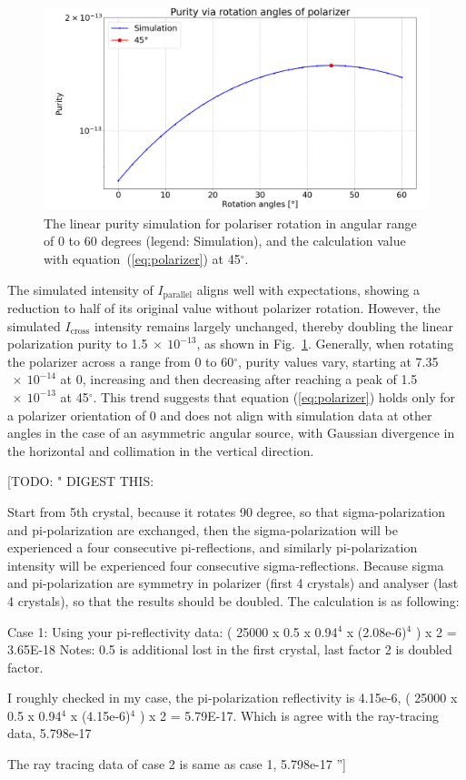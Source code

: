 \documentclass{iucr}
\newcommand{\todo}[1]{{\color{red}[TODO: "#1'']}}
\begin{document}
\begin{figure}\label{fig:polarizer}
\centering
\includegraphics[width=0.95\linewidth]{figures/polarizer.png}
\caption{The linear purity simulation for polariser rotation in angular range of 0 to 60 degrees (legend: Simulation), and the calculation value with equation~(\ref{eq:polarizer}) at 45$^\circ$.}
\end{figure}

The simulated intensity of  $I_\text{parallel}$ aligns well with expectations, showing a reduction to half of its original value without polarizer rotation.
However, the simulated $I_\text{cross}$ intensity remains largely unchanged, thereby doubling the linear polarization purity to 1.5$~\times~10^{-13}$, as shown in Fig.~\ref{fig:polarizer}.
Generally, when rotating the polarizer across a range from 0 to 60$^\circ$, purity values vary, starting at 7.35$~\times~10^{-14}$ at 0, increasing and then decreasing after reaching a peak of 1.5$~\times~10^{-13}$ at 45$^\circ$.
This trend suggests that equation (\ref{eq:polarizer}) holds only for a polarizer orientation of 0 and does not align with simulation data at other angles in the case of an asymmetric angular source, with Gaussian divergence in the horizontal and collimation in the vertical direction.


\todo{
DIGEST THIS: 

Start from 5th crystal, because it rotates 90 degree, so that sigma-polarization and pi-polarization are exchanged, then the sigma-polarization will be experienced a four consecutive pi-reflections, and similarly pi-polarization intensity will be experienced four consecutive sigma-reflections. Because sigma and pi-polarization are symmetry in polarizer (first 4 crystals) and analyser (last 4 crystals), so that the results should be doubled. The calculation is as following:

Case 1: 
Using your pi-reflectivity data:
( 25000 x 0.5 x 0.94$^4$ x (2.08e-6)$^4$ ) x 2 = 3.65E-18
Notes: 0.5 is additional lost in the first crystal, last factor 2 is doubled factor.

I roughly checked in my case,  the pi-polarization reflectivity is 4.15e-6, 
( 25000 x 0.5 x 0.94$^4$ x (4.15e-6)$^4$ ) x 2 = 5.79E-17.
Which is  agree with the ray-tracing data, 5.798e-17

The ray tracing data of case 2 is same as case 1, 5.798e-17
}
\end{document}

